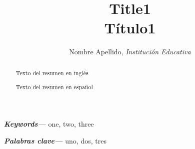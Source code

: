 \documentclass[utf8, twoside,]{article}
\providecommand{\keywords}[1]
{
  \small	
  \textbf{\textit{Keywords---}} #1
}
\providecommand{\pclave}[1]
{
  \small	
  \textbf{\textit{Palabras clave---}} #1
}
\begin{document}
\begin{otherlanguage}{spanish}


\title{Title1\\ \medskip %
Título1}
\author{Nombre Apellido, \it{Institución Educativa}}
\date{}


\begin{singlespace}



\maketitle %




\def\abstractname{{Abstract}}


\begin{abstract}
     \vspace{-0.2cm} %
     
Texto del resumen en inglés
  
\end{abstract}


\def\abstractname{{Resumen}}


\begin{abstract}
      \vspace{-0.2cm} %
      
Texto del resumen en español
   
\end{abstract}


\keywords{one, two, three}


\pclave{uno, dos, tres}




\end{singlespace}


\end{otherlanguage}
\end{document}
